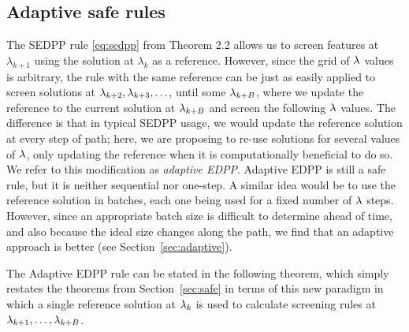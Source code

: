 \subsection{Adaptive safe rules}

The SEDPP rule \eqref{eq:sedpp} from Theorem 2.2 allows us to screen features at $\lambda_{k+1}$ using the solution at $\lambda_k$ as a reference. However, since the grid of $\lambda$ values is arbitrary, the rule with the same reference can be just as easily applied to screen solutions at $\lambda_{k+2}, \lambda_{k+3}, \ldots$, until some $\lambda_{k+B}$, where we update the reference to the current solution at $\lambda_{k+B}$ and screen the following $\lambda$ values.  The difference is that in typical SEDPP usage, we would update the reference solution at every step of path; here, we are proposing to re-use solutions for several values of $\lambda$, only updating the reference when it is computationally beneficial to do so.  We refer to this modification as \emph{adaptive EDPP}.  Adaptive EDPP is still a safe rule, but it is neither sequential nor one-step.  A similar idea would be to use the reference solution in batches, each one being used for a fixed number of $\lambda$ steps.  However, since an appropriate batch size is difficult to determine ahead of time, and also because the ideal size changes along the path, we find that an adaptive approach is better (see Section~\ref{sec:adaptive}).

The Adaptive EDPP rule can be stated in the following theorem, which simply restates the theorems from Section~\ref{sec:safe} in terms of this new paradigm in which a single reference solution at $\lambda_k$ is used to calculate screening rules at $\lambda_{k+1}, \ldots, \lambda_{k+B}$.


